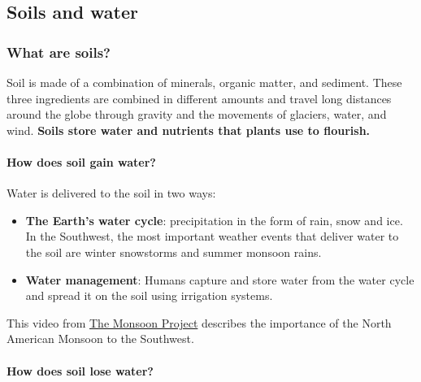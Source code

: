 \documentclass[12pt,]{article}
\providecommand{\tightlist}{%
  \setlength{\itemsep}{0pt}\setlength{\parskip}{0pt}}
\let\oldparagraph\paragraph
\renewcommand{\paragraph}[1]{\oldparagraph{#1}\mbox{}}
\begin{document}
\hypertarget{soils-and-water}{%
\subsection{Soils and water}\label{soils-and-water}}

\hypertarget{what-are-soils}{%
\subsubsection*{What are soils?}\label{what-are-soils}}

Soil is made of a combination of minerals, organic matter, and sediment. These three ingredients are combined in different amounts and travel long distances around the globe through gravity and the movements of glaciers, water, and wind. \textbf{Soils store water and nutrients that plants use to flourish.}

\hypertarget{how-does-soil-gain-water}{%
\paragraph{How does soil gain water?}\label{how-does-soil-gain-water}}

Water is delivered to the soil in two ways:

\begin{itemize}
\tightlist
\item
  \textbf{The Earth's water cycle}: precipitation in the form of rain, snow and ice. In the Southwest, the most important weather events that deliver water to the soil are winter snowstorms and summer monsoon rains.
\item
  \textbf{Water management}: Humans capture and store water from the water cycle and spread it on the soil using irrigation systems.
\end{itemize}

This video from \href{https://themonsoonproject.org/}{The Monsoon Project} describes the importance of the North American Monsoon to the Southwest.

\hypertarget{how-does-soil-lose-water}{%
\paragraph{How does soil lose water?}\label{how-does-soil-lose-water}}
\end{document}
